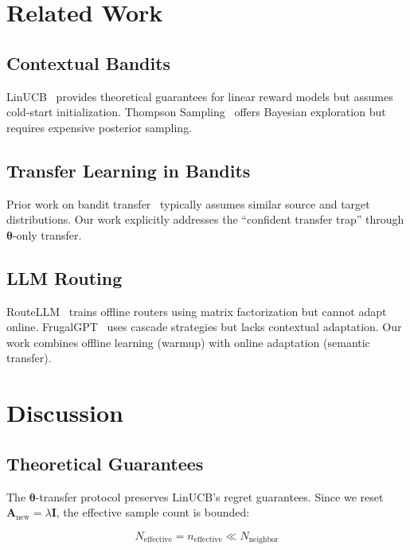 \documentclass[sigconf]{acmart}
\begin{document}
\section{Related Work}

\subsection{Contextual Bandits}

LinUCB~\cite{li2010contextual} provides theoretical guarantees for linear reward models but assumes cold-start initialization. Thompson Sampling~\cite{agrawal2013thompson} offers Bayesian exploration but requires expensive posterior sampling.

\subsection{Transfer Learning in Bandits}

Prior work on bandit transfer~\cite{lazaric2012transfer, bouneffouf2019survey} typically assumes similar source and target distributions. Our work explicitly addresses the ``confident transfer trap'' through $\boldsymbol{\theta}$-only transfer.

\subsection{LLM Routing}

RouteLLM~\cite{ong2024routellm} trains offline routers using matrix factorization but cannot adapt online. FrugalGPT~\cite{chen2023frugalgpt} uses cascade strategies but lacks contextual adaptation. Our work combines offline learning (warmup) with online adaptation (semantic transfer).

\section{Discussion}

\subsection{Theoretical Guarantees}

The $\boldsymbol{\theta}$-transfer protocol preserves LinUCB's regret guarantees. Since we reset $\mathbf{A}_{\text{new}} = \lambda \mathbf{I}$, the effective sample count is bounded:

\begin{equation}
N_{\text{effective}} = n_{\text{effective}} \ll N_{\text{neighbor}}
\end{equation}
\end{document}
